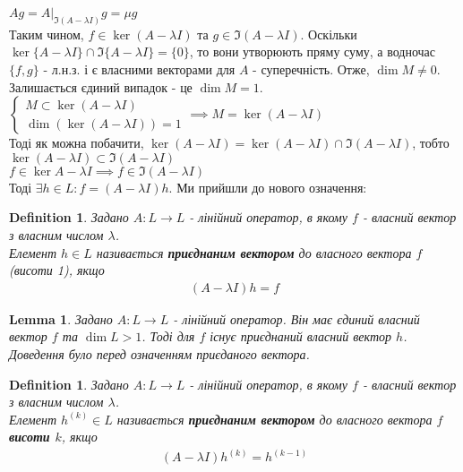 \documentclass[a4paper, 10pt]{article}
\theoremstyle{theoremdd}
\newtheorem{definition}[theorem]{Definition}
\newtheorem{lemma}[theorem]{Lemma}
\begin{document}
$Ag = A |_{\Im(A-\lambda I)} g = \mu g$\\
Таким чином, $f \in \ker(A-\lambda I)$ та $g \in \Im(A-\lambda I)$. Оскільки $\ker \{ A-\lambda I \} \cap \Im \{ A - \lambda I \} = \{ 0 \}$, то вони утворюють пряму суму, а водночас $\{f,g\}$ - л.н.з. і є власними векторами для $A$ - суперечність. Отже, $\dim M \neq 0$.
\bigskip \\
Залишається єдиний випадок - це $\dim M = 1$.\\
$\begin{cases}
M \subset \ker(A-\lambda I)\\
\dim{(\ker(A-\lambda I))} = 1
\end{cases}
\implies M = \ker(A-\lambda I)$
\bigskip \\
Тоді як можна побачити, $\ker(A-\lambda I) = \ker(A-\lambda I) \cap \Im (A - \lambda I)$, тобто $\ker(A-\lambda I) \subset \Im(A-\lambda I)$\\
$f \in \ker{A- \lambda I} \implies f \in \Im(A - \lambda I)$\\
Тоді $\exists h \in L: f = (A-\lambda I)h$. Ми прийшли до нового означення:

\begin{definition}
Задано $A: L \to L$ - лінійний оператор, в якому $f$ - власний вектор з власним числом $\lambda$.\\
Елемент $h \in L$ називається \textbf{приєднаним вектором} до власного вектора $f$ (висоти 1), якщо
\begin{align*}
(A-\lambda I)h = f
\end{align*}
\end{definition}

\begin{lemma}
Задано $A: L \to L$ - лінійний оператор. Він має єдиний власний вектор $f$ та $\dim L > 1$. Тоді для $f$ існує приєднаний власний вектор $h$.\\
\textit{Доведення було перед означенням приєданого вектора.}
\end{lemma}

\begin{definition}
Задано $A: L \to L$ - лінійний оператор, в якому $f$ - власний вектор з власним числом $\lambda$.\\
Елемент $h^{(k)} \in L$ називається \textbf{приєднаним вектором} до власного вектора $f$ \textbf{висоти $k$}, якщо
\begin{align*}
(A-\lambda I)h^{(k)} = h^{(k-1)}
\end{align*}
\end{definition}
\end{document}
